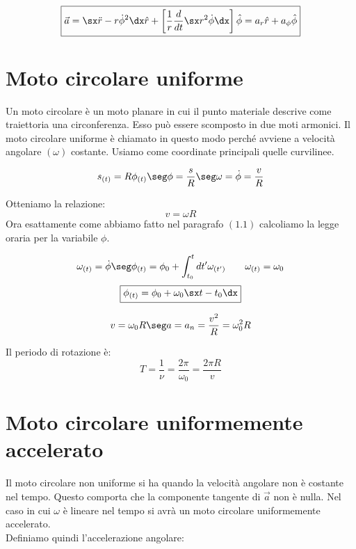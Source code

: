 \begin{equation}
\boxed{\vec a = \sx \ddot r - r\dot\phi^2\dx\hat r + \left[\frac{1}{r}\frac{d}{dt} \sx r^2\dot\phi\dx\right]\hat\phi = a_r\hat r + a_{\phi}\hat\phi}
\end{equation}




\section{Moto circolare uniforme}
Un moto circolare è un moto planare in cui il punto materiale descrive come traiettoria una circonferenza. Esso può essere scomposto in due moti armonici. Il moto circolare uniforme è chiamato in questo modo perché avviene a velocità angolare $(\omega)$ costante.
Usiamo come coordinate principali quelle curvilinee.




\begin{equation}
s_{(t)} = R\phi_{(t)}\seg \phi = \frac sR\seg \omega = \dot \phi = \frac vR
\end{equation}
 
 Otteniamo la relazione:
\begin{equation}
\boxed{v = \omega R}
\end{equation}
 Ora esattamente come abbiamo fatto nel paragrafo $(1.1)$ calcoliamo la legge oraria per la variabile $\phi$.
 
\begin{equation}
\omega_{(t)} = \dot\phi \seg \phi_{(t)} = \phi_0 + \int_{t_0}^{t}dt'\omega_{(t')}\quad\quad \omega_{(t)} = \omega_0
\end{equation}
\begin{equation}
\boxed{\phi_{(t)} = \phi_0 +\omega_0\sx t - t_0\dx}
\end{equation}

\begin{equation}
v = \omega_0R\seg a = a_n = \frac{v^2}R = \omega_0^2R
\end{equation}

Il periodo di rotazione è:
\begin{equation}
T = \frac1\nu = \frac{2\pi}{\omega_0} = \frac{2\pi R}v
\end{equation}




\section{Moto circolare uniformemente accelerato}
Il moto circolare non uniforme si ha quando la velocità angolare non è costante nel tempo. Questo comporta che la componente tangente di $\vec a$ non è nulla. Nel caso in cui $\omega$ è lineare nel tempo si avrà un moto circolare uniformemente accelerato.
\\ Definiamo quindi l'accelerazione angolare:




